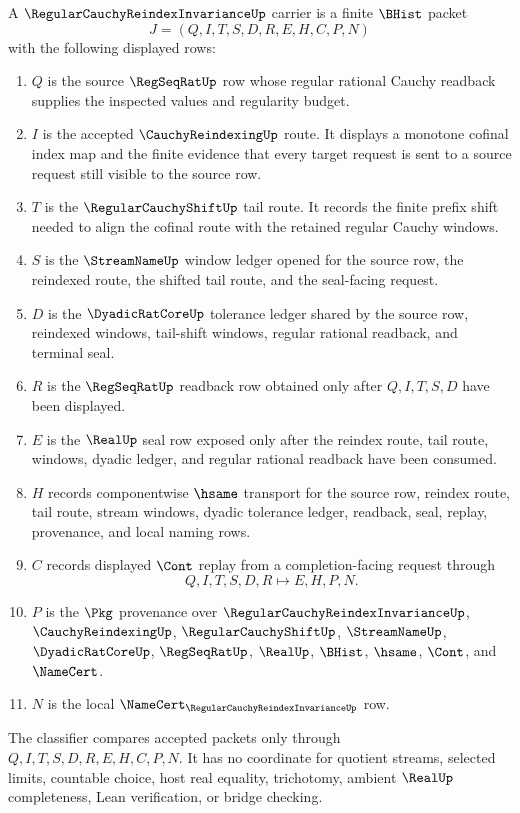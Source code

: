 \begin{definition}
\label{def:regular-cauchy-reindex-invariance-carrier}
A $\RegularCauchyReindexInvarianceUp$ carrier is a finite $\BHist$ packet
$$
J=(Q,I,T,S,D,R,E,H,C,P,N)
$$
with the following displayed rows:
\begin{enumerate}
\item $Q$ is the source $\RegSeqRatUp$ row whose regular rational Cauchy readback supplies the inspected values and regularity budget.
\item $I$ is the accepted $\CauchyReindexingUp$ route. It displays a monotone cofinal index map and the finite evidence that every target request is sent to a source request still visible to the source row.
\item $T$ is the $\RegularCauchyShiftUp$ tail route. It records the finite prefix shift needed to align the cofinal route with the retained regular Cauchy windows.
\item $S$ is the $\StreamNameUp$ window ledger opened for the source row, the reindexed route, the shifted tail route, and the seal-facing request.
\item $D$ is the $\DyadicRatCoreUp$ tolerance ledger shared by the source row, reindexed windows, tail-shift windows, regular rational readback, and terminal seal.
\item $R$ is the $\RegSeqRatUp$ readback row obtained only after $Q,I,T,S,D$ have been displayed.
\item $E$ is the $\RealUp$ seal row exposed only after the reindex route, tail route, windows, dyadic ledger, and regular rational readback have been consumed.
\item $H$ records componentwise $\hsame$ transport for the source row, reindex route, tail route, stream windows, dyadic tolerance ledger, readback, seal, replay, provenance, and local naming rows.
\item $C$ records displayed $\Cont$ replay from a completion-facing request through
$$
Q,I,T,S,D,R \longmapsto E,H,P,N .
$$
\item $P$ is the $\Pkg$ provenance over $\RegularCauchyReindexInvarianceUp$, $\CauchyReindexingUp$, $\RegularCauchyShiftUp$, $\StreamNameUp$, $\DyadicRatCoreUp$, $\RegSeqRatUp$, $\RealUp$, $\BHist$, $\hsame$, $\Cont$, and $\NameCert$.
\item $N$ is the local $\NameCert_{\RegularCauchyReindexInvarianceUp}$ row.
\end{enumerate}
The classifier compares accepted packets only through $Q,I,T,S,D,R,E,H,C,P,N$. It has no coordinate for quotient streams, selected limits, countable choice, host real equality, trichotomy, ambient $\RealUp$ completeness, Lean verification, or bridge checking.
\end{definition}

